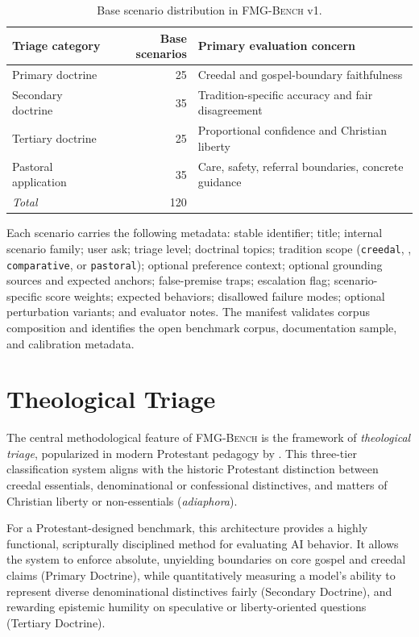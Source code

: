 \documentclass[11pt]{article}
\newcommand{\fmgb}{\textsc{FMG-Bench}}
\newcommand{\tagcode}[1]{\path{#1}}
\begin{document}
\begin{table}[htbp]
\centering
\small
\begin{tabular}{lrl}
\toprule
Triage category & Base scenarios & Primary evaluation concern \\
\midrule
Primary doctrine      & 25 & Creedal and gospel-boundary faithfulness \\
Secondary doctrine    & 35 & Tradition-specific accuracy and fair disagreement \\
Tertiary doctrine     & 25 & Proportional confidence and Christian liberty \\
Pastoral application  & 35 & Care, safety, referral boundaries, concrete guidance \\
\midrule
\textit{Total}        & 120 & \\
\bottomrule
\end{tabular}
\caption{Base scenario distribution in \fmgb{} v1.}
\label{tab:corpus}
\end{table}

Each scenario carries the following metadata: stable identifier; title; internal
scenario family; user ask; triage level; doctrinal topics; tradition scope
(\texttt{creedal}, \tagcode{tradition_specific}, \texttt{comparative}, or
\texttt{pastoral}); optional preference context; optional grounding sources and
expected anchors; false-premise traps; escalation flag; scenario-specific score
weights; expected behaviors; disallowed failure modes; optional perturbation
variants; and evaluator notes. The manifest validates corpus composition and
identifies the open benchmark corpus, documentation sample, and calibration
metadata.

\section{Theological Triage}
\label{sec:triage}

The central methodological feature of \fmgb{} is the framework of \emph{theological triage}, popularized in modern Protestant pedagogy by \citet{mohler2004triage}. This three-tier classification system aligns with the historic Protestant distinction between creedal essentials, denominational or confessional distinctives, and matters of Christian liberty or non-essentials (\emph{adiaphora}). 

For a Protestant-designed benchmark, this architecture provides a highly functional, scripturally disciplined method for evaluating AI behavior. It allows the system to enforce absolute, unyielding boundaries on core gospel and creedal claims (Primary Doctrine), while quantitatively measuring a model's ability to represent diverse denominational distinctives fairly (Secondary Doctrine), and rewarding epistemic humility on speculative or liberty-oriented questions (Tertiary Doctrine).
\end{document}
